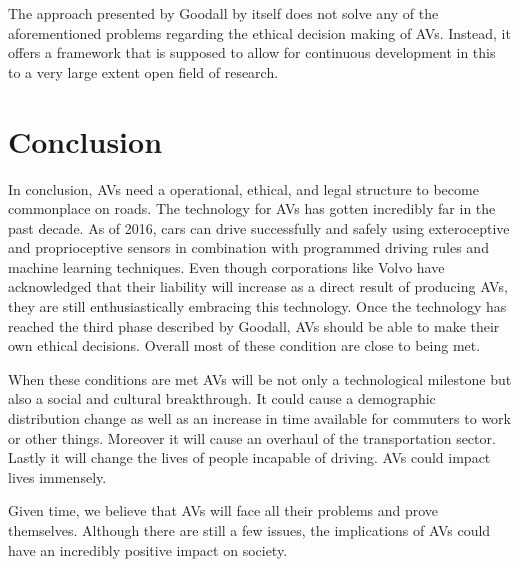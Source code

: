 \documentclass[11pt]{article}
\begin{document}
The approach presented by Goodall by itself does not solve any of the aforementioned problems regarding the ethical decision making of AVs. Instead, it offers a framework that is supposed to allow for continuous development in this to a very large extent open field of research. 

\section{Conclusion}
In conclusion, AVs need a operational, ethical, and legal structure to become commonplace on roads. The technology for AVs has gotten incredibly far in the past decade. As of 2016, cars can drive successfully and safely using exteroceptive and proprioceptive sensors in combination with programmed driving rules and machine learning techniques. Even though corporations like Volvo have acknowledged that their liability will increase as a direct result of producing AVs, they are still enthusiastically embracing this technology. Once the technology has reached the third phase described by Goodall, AVs should be able to make their own ethical decisions. Overall most of these condition are close to being met. 

When these conditions are met AVs will be not only a technological milestone but also a social and cultural breakthrough. It could cause a demographic distribution change as well as an increase in time available for commuters to work or other things. Moreover it will cause an overhaul of the transportation sector. Lastly it will change the lives of people incapable of driving. AVs could impact lives immensely. 

Given time, we believe that AVs will face all their problems and prove themselves. Although there are still a few issues, the implications of AVs could have an incredibly positive impact on society. 



%

\end{document}

